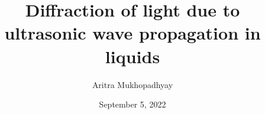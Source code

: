 \documentclass[12pt]{article}
\title{\textbf{Diffraction of light due to ultrasonic wave propagation in liquids}}
\author{Aritra Mukhopadhyay}
\date{September 5, 2022}
\begin{document}
	\maketitle
	
	


	
	
	\nocite{*}
\end{document}
